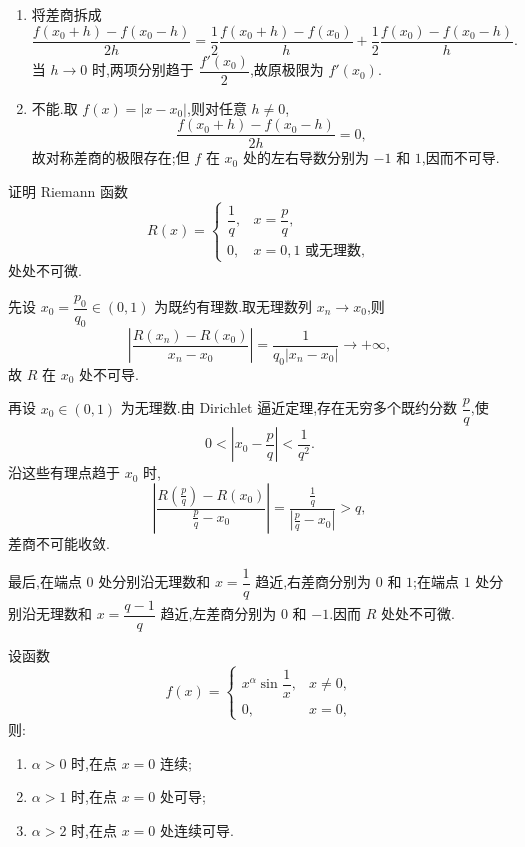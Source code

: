 \begin{solution}
    \leavevmode
    \begin{enumerate}
        \item 将差商拆成
              \[
                  \dfrac{f(x_0+h)-f(x_0-h)}{2h}
                  =\dfrac{1}{2}\dfrac{f(x_0+h)-f(x_0)}{h}
                  +\dfrac{1}{2}\dfrac{f(x_0)-f(x_0-h)}{h}.
              \]
              当 $h\to0$ 时,两项分别趋于 $\dfrac{f'(x_0)}{2}$,故原极限为 $f'(x_0)$.
        \item 不能.取 $f(x)=|x-x_0|$,则对任意 $h\neq0$,
              \[
                  \dfrac{f(x_0+h)-f(x_0-h)}{2h}=0,
              \]
              故对称差商的极限存在;但 $f$ 在 $x_0$ 处的左右导数分别为 $-1$ 和 $1$,因而不可导.
    \end{enumerate}
\end{solution}

\begin{example}[\markstar]
    证明 Riemann 函数
    \[
        R(x)=
        \begin{cases}
            \dfrac{1}{q}, & x=\dfrac{p}{q},    \\
            0,            & x=0,1\text{ 或无理数},
        \end{cases}
    \]
    处处不可微.
\end{example}
\exampleblank

\begin{solution}
    先设 $x_0=\dfrac{p_0}{q_0}\in(0,1)$ 为既约有理数.取无理数列 $x_n\to x_0$,则
    \[
        \left|\dfrac{R(x_n)-R(x_0)}{x_n-x_0}\right|
        =\dfrac{1}{q_0|x_n-x_0|}\longrightarrow+\infty,
    \]
    故 $R$ 在 $x_0$ 处不可导.

    再设 $x_0\in(0,1)$ 为无理数.由 Dirichlet 逼近定理,存在无穷多个既约分数 $\dfrac{p}{q}$,使
    \[
        0<\left|x_0-\dfrac{p}{q}\right|<\dfrac{1}{q^2}.
    \]
    沿这些有理点趋于 $x_0$ 时,
    \[
        \left|\dfrac{R\left(\frac{p}{q}\right)-R(x_0)}
        {\frac{p}{q}-x_0}\right|
        =\dfrac{\frac{1}{q}}{\left|\frac{p}{q}-x_0\right|}>q,
    \]
    差商不可能收敛.

    最后,在端点 $0$ 处分别沿无理数和 $x=\dfrac{1}{q}$ 趋近,右差商分别为 $0$ 和 $1$;在端点 $1$ 处分别沿无理数和 $x=\dfrac{q-1}{q}$ 趋近,左差商分别为 $0$ 和 $-1$.因而 $R$ 处处不可微.
\end{solution}

\begin{proposition}[\markstar]
    设函数
    \[
        f(x)=
        \begin{cases}
            x^\alpha\sin\dfrac{1}{x}, & x\neq0, \\
            0,                        & x=0,
        \end{cases}
    \]
    则:
    \begin{enumerate}
        \item $\alpha>0$ 时,在点 $x=0$ 连续;
        \item $\alpha>1$ 时,在点 $x=0$ 处可导;
        \item $\alpha>2$ 时,在点 $x=0$ 处连续可导.
    \end{enumerate}
\end{proposition}

